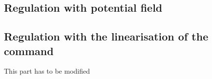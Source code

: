 \subsection{Regulation with potential field}

\subsection{Regulation with the linearisation of the command}

This part has to be modified 


